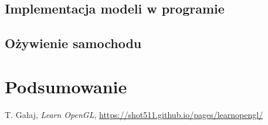 \documentclass[a4paper,12pt]{article}
\numberwithin{equation}{section}
\begin{document}
\subsection{Implementacja modeli w programie}
\subsection{Ożywienie samochodu}

\section{Podsumowanie}



\begin{thebibliography}{9}
     T. Gałaj, \emph{Learn OpenGL}, \href{https://shot511.github.io/pages/learnopengl/}{https://shot511.github.io/pages/learnopengl/}
\end{thebibliography}
\end{document}
